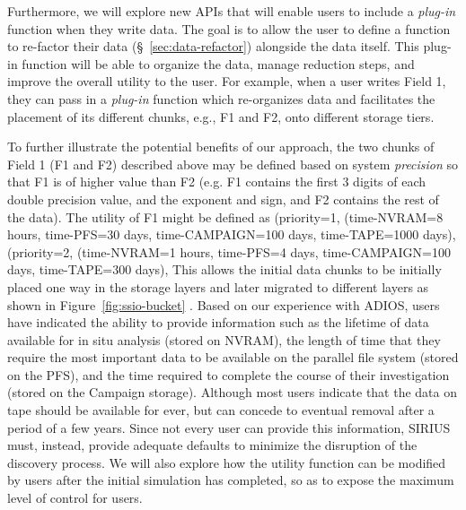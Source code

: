Furthermore, we will explore new APIs that will enable users to include a {\it plug-in} function when 
they write data. The goal is to allow the user to define a function 
to re-factor their data (\S~\ref{sec:data-refactor}) alongside the data
itself. This plug-in function will be able to organize the data, manage
reduction steps, and improve the overall utility to the user. 
For example, when a user writes Field 1, they can pass in a {\it plug-in} function 
which re-organizes data and facilitates the 
placement of its different chunks, e.g., F1 and F2,  onto different storage
tiers.

To further illustrate the potential benefits of our approach, the two chunks of Field 1 (F1 and F2) 
described above may be defined based on system {\it precision} so that F1 is of higher value 
than F2 (e.g. F1 contains the first 3 digits of each double precision value, and the exponent and 
sign, and F2 contains the rest of the data). 
%
The utility of F1 might be defined as (priority=1, (time-NVRAM=8 hours, time-PFS=30 days, time-CAMPAIGN=100 days, time-TAPE=1000 days), 
(priority=2, (time-NVRAM=1 hours, time-PFS=4 days, time-CAMPAIGN=100 days, time-TAPE=300 days), 
This allows the initial data chunks to be initially 
placed one way in the storage layers and later migrated to different layers as shown in 
Figure~\ref{fig:ssio-bucket} . 
Based on our experience with ADIOS, users
have indicated the ability to provide information such as the lifetime of
data available for in situ analysis (stored on NVRAM), the length of time
that they require the most important data to be available on the parallel
file system (stored on the PFS), and the time required to complete the
course of their investigation (stored on the Campaign storage). Although
most users indicate that the data on tape should be available for ever, but
can concede to eventual removal after a period of a few years. Since not
every user can provide this information, SIRIUS must, instead, provide
adequate defaults to minimize the disruption of the discovery process. We
will also explore how the utility function can be modified by users after
the initial simulation has completed, so as to expose the maximum level of
control for users. 

